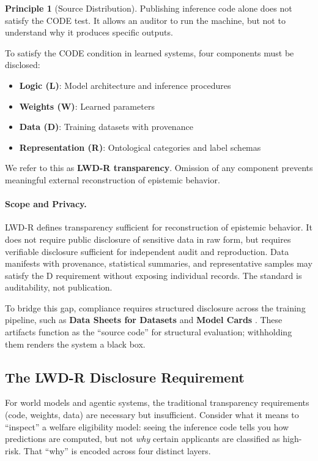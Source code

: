 \documentclass[11pt,a4paper]{article}
\theoremstyle{definition}
\newtheorem{principle}{Principle}[section]
\begin{document}
\begin{principle}[Source Distribution]
Publishing inference code alone does not satisfy the CODE test. It allows an auditor to run the machine, but not to understand why it produces specific outputs.
\end{principle}

To satisfy the CODE condition in learned systems, four components must be disclosed:

\begin{itemize}[noitemsep]
    \item \textbf{Logic (L)}: Model architecture and inference procedures
    \item \textbf{Weights (W)}: Learned parameters
    \item \textbf{Data (D)}: Training datasets with provenance
    \item \textbf{Representation (R)}: Ontological categories and label schemas
\end{itemize}

We refer to this as \textbf{LWD-R transparency}. Omission of any component prevents meaningful external reconstruction of epistemic behavior.

\paragraph{Scope and Privacy.} LWD-R defines transparency sufficient for reconstruction of epistemic behavior. It does not require public disclosure of sensitive data in raw form, but requires verifiable disclosure sufficient for independent audit and reproduction. Data manifests with provenance, statistical summaries, and representative samples may satisfy the D requirement without exposing individual records. The standard is auditability, not publication.

To bridge this gap, compliance requires structured disclosure across the training pipeline, such as \textbf{Data Sheets for Datasets} \citep{gebru2021} and \textbf{Model Cards} \citep{mitchell2019}. These artifacts function as the ``source code'' for structural evaluation; withholding them renders the system a black box.

\subsection{The LWD-R Disclosure Requirement}

For world models and agentic systems, the traditional transparency requirements (code, weights, data) are necessary but insufficient. Consider what it means to ``inspect'' a welfare eligibility model: seeing the inference code tells you how predictions are computed, but not \textit{why} certain applicants are classified as high-risk. That ``why'' is encoded across four distinct layers.
\end{document}
